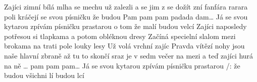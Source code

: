 \begin{TEXT}{Zajíci}
\SLOKA {}zimní bílá mlha  se  mechu \NL
{}  už  \NL
{} zalezli a  se jim z  \NL
{} se dožít  
\REFREN  {} zní fanfára  rarara \NL
{} poli kráčejí   \NL
{} se svou   písničku  \NL
{} že  budou  \NL
Pam pam pam padada dam… \NL
Já se svou kytarou zpívám písničku prastarou \NL
o tom že malí budou velcí 
\SLOKA Zajíci naposledy potřesou si tlapkama \NL
a potom obléknou dresy \NL
Začíná specielní slalom mezi brokama \NL
na trati pole louky lesy 
\SLOKA Už volá vrchní zajíc Pravda vítězí \NL
nohy jsou naše hlavní zbraně \NL
až tu to skončí sraz je v sedm večer na mezi \NL
a teď zajíci hurá na ně 
\REFREN  … pam pam pam… \NL
Já se svou kytarou zpívám písničku prastarou \NL
/:  že  budou   \NL
{} všichni lí budou lcí 
\end{TEXT}
